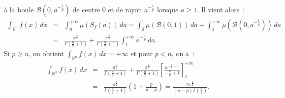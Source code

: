 {\begin{enumerate}
{\`a la boule $\mathcal{B}(0, a^{-\frac{1}{p}})$ de centre 0 et de
rayon $a^{-\frac{1}{p}}$ lorsque $a\geq 1$. Il vient alors~:
\begin{eqnarray*}
\int_{\mathbb{R}^{n}} f(x)\,dx &=& \int_{0}^{+\infty}
\mu\left(S_{f}(a)\right)\,da = \int_{0}^{1}
\mu\left(\mathcal{B}(0,1) \right)\,da + \int_{1}^{+\infty}
\mu\left(\mathcal{B}(0, a^{-\frac{1}{p}})\right)\,da\\
& = & \frac{\pi^{\frac{n}{2}}}{\Gamma\left(\frac{n}{2}+1\right)} +
\frac{\pi^{\frac{n}{2}}}{\Gamma\left(\frac{n}{2}+1\right)}\int_{1}^{+\infty}
a^{-\frac{n}{p}}\,da.
\end{eqnarray*}
Si $p\geq n$, on obtient $\int_{\mathbb{R}^{n}} f(x)\,dx =+\infty$
et pour $p<n$, on a~:
\begin{eqnarray*}
\int_{\mathbb{R}^{n}} f(x)\,dx & =
&\frac{\pi^{\frac{n}{2}}}{\Gamma\left(\frac{n}{2}+1\right)} +
\frac{\pi^{\frac{n}{2}}}{\Gamma\left(\frac{n}{2}+1\right)}\left[\frac{a^{-\frac{n}{p}+1}}{-\frac{n}{p}+1}\right]_{1}^{+\infty}\\
&=&\frac{\pi^{\frac{n}{2}}}{\Gamma\left(\frac{n}{2}+1\right)}\left(1
+ \frac{p}{n-p} \right) = \frac{2\pi^{\frac{n}{2}}}{(n -
p)\Gamma\left(\frac{n}{2}\right)}.
\end{eqnarray*}}
\end{enumerate}
}